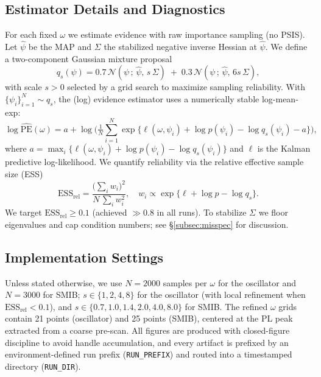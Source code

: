 \documentclass[conference]{IEEEtran}
\begin{document}
\subsection{Estimator Details and Diagnostics}
\label{subsec:estimator}

For each fixed $\omega$ we estimate evidence with raw importance sampling (no PSIS). Let $\hat{\psi}$ be the MAP and $\Sigma$ the stabilized negative inverse Hessian at $\hat{\psi}$. We define a two-component Gaussian mixture proposal
\begin{equation}
q_s(\psi) = 0.7\, \mathcal{N}(\psi\,;\, \hat{\psi},\, s\, \Sigma)\; +\; 0.3\, \mathcal{N}(\psi\,;\, \hat{\psi},\, 6s\, \Sigma),
\end{equation}
with scale $s>0$ selected by a grid search to maximize sampling reliability. With $\{\psi_i\}_{i=1}^N \sim q_s$, the (log) evidence estimator uses a numerically stable log-mean-exp:
\begin{equation}
\log \widehat{\mathrm{PE}}(\omega) = a + \log\Big(\tfrac{1}{N}\sum_{i=1}^N \exp\{\ell(\omega,\psi_i)+\log p(\psi_i)-\log q_s(\psi_i)-a\}\Big),
\end{equation}
where $a=\max_i\{\ell(\omega,\psi_i)+\log p(\psi_i)-\log q_s(\psi_i)\}$ and $\ell$ is the Kalman predictive log-likelihood. We quantify reliability via the relative effective sample size (ESS)
\begin{equation}
\mathrm{ESS}_{\mathrm{rel}}= \frac{\big(\sum_i w_i\big)^2}{N\,\sum_i w_i^2},\quad w_i \propto \exp\{\ell+\log p-\log q_s\}.
\end{equation}
We target $\mathrm{ESS}_{\mathrm{rel}}\ge 0.1$ (achieved $\gg 0.8$ in all runs). To stabilize $\Sigma$ we floor eigenvalues and cap condition numbers; see \S\ref{subsec:misspec} for discussion.

\subsection{Implementation Settings}

Unless stated otherwise, we use $N=2000$ samples per $\omega$ for the oscillator and $N=3000$ for SMIB; $s\in\{1,2,4,8\}$ for the oscillator (with local refinement when $\mathrm{ESS}_{\mathrm{rel}}<0.1$), and $s\in\{0.7,1.0,1.4,2.0,4.0,8.0\}$ for SMIB. The refined $\omega$ grids contain 21 points (oscillator) and 25 points (SMIB), centered at the PL peak extracted from a coarse pre-scan. All figures are produced with closed-figure discipline to avoid handle accumulation, and every artifact is prefixed by an environment-defined run prefix (\texttt{RUN\_PREFIX}) and routed into a timestamped directory (\texttt{RUN\_DIR}).
\end{document}
